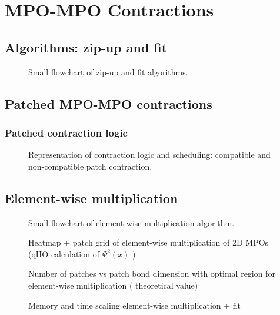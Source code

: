 \chapter{MPO-MPO Contractions}
\label{chap:MPOcontr}

\section{Algorithms: zip-up and fit}
\begin{figure}[ht!]
    \caption{Small flowchart of zip-up and fit algorithms. }
\end{figure}


\section{Patched MPO-MPO contractions}
\subsection{Patched contraction logic}

\begin{figure}[ht!]
    \caption{Representation of contraction logic and scheduling: compatible and non-compatible patch contraction.}
\end{figure}
\section{Element-wise multiplication}

\begin{figure}[ht!]
    \caption{Small flowchart of element-wise multiplication algorithm. }
\end{figure}

\begin{figure}[ht!]
    \caption{Heatmap + patch grid of element-wise multiplication of 2D MPOs (qHO calculation of $\Psi^2(x)$ ) }
\end{figure}


\begin{figure}[ht!]
    \caption{Number of patches vs patch bond dimension with optimal region for element-wise multiplication ( theoretical value) }
\end{figure}

\begin{figure}[ht!]
    \caption{Memory and time scaling element-wise multiplication + fit  }
\end{figure}
